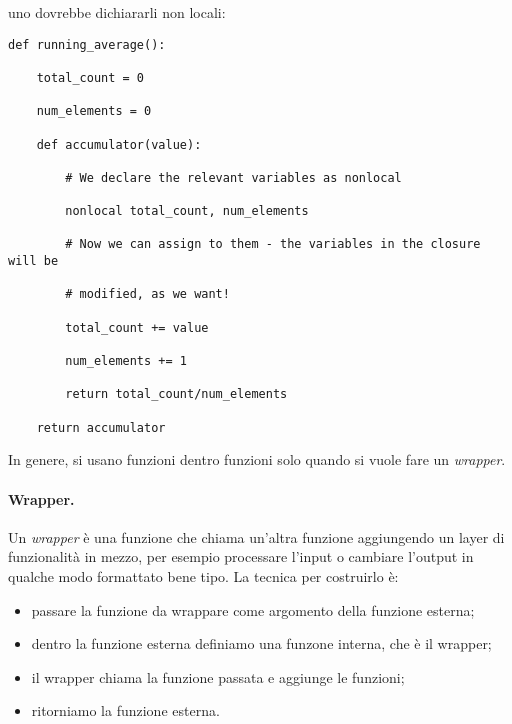 \documentclass[10pt, a4paper, titlepage]{book}
\begin{document}
uno dovrebbe dichiararli non locali:

\begin{verbatim}
def running_average():

	total_count = 0

	num_elements = 0

	def accumulator(value):

		# We declare the relevant variables as nonlocal

		nonlocal total_count, num_elements

		# Now we can assign to them - the variables in the closure will be

		# modified, as we want!

		total_count += value

		num_elements += 1

		return total_count/num_elements

	return accumulator
\end{verbatim}

In genere, si usano funzioni dentro funzioni solo quando si vuole fare un \textit{wrapper}.

\paragraph{Wrapper.} Un \textit{wrapper} è una funzione che chiama un'altra funzione aggiungendo un layer di funzionalità in mezzo, per esempio processare l'input o cambiare l'output in qualche modo formattato bene tipo. La tecnica per costruirlo è:
\begin{itemize}
	\item passare la funzione da wrappare come argomento della funzione esterna;
	\item dentro la funzione esterna definiamo una funzone interna, che è il wrapper;
	\item il wrapper chiama la funzione passata e aggiunge le funzioni;
	\item ritorniamo la funzione esterna.
\end{itemize}
\end{document}
